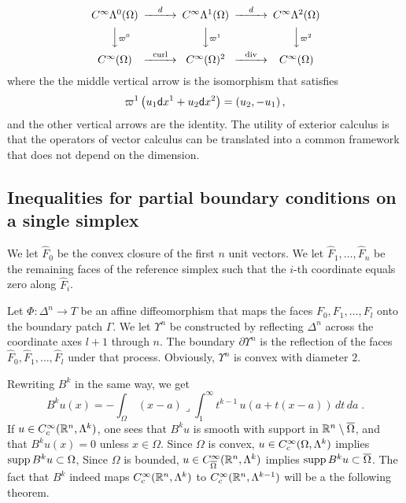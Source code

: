\documentclass[a4paper]{article}
\begin{document}
\begin{remark}
\[\begin{CD}
        C^\infty\Alt^0(\Omega) @>{d}>> C^\infty\Alt^1(\Omega) @>{d}>> C^\infty\Alt^2(\Omega)
        \\
        @VV{\varpi^{0}}V 
        @VV{\varpi^{1}}V 
        @VV{\varpi^{2}}V 
        \\
        C^\infty(\Omega) @>{\curl}>> C^\infty(\Omega)^{2} @>{\divergence}>> C^\infty(\Omega)
    \end{CD}
    \]
    where the the middle vertical arrow is the isomorphism that satisfies 
    \begin{align*}
        \varpi^{1}\left( u_1 {\mathsf d}x^{1} + u_2 {\mathsf d}x^{2} \right)
        =
        \left( u_2, -u_1 \right),
    \end{align*}
    and the other vertical arrows are the identity. 
    The utility of exterior calculus is that the operators of vector calculus can be translated into a common framework that does not depend on the dimension.
\end{remark}






\subsection{Inequalities for partial boundary conditions on a single simplex}


We let $\hat F_0$ be the convex closure of the first $n$ unit vectors. 
We let $\hat F_1, \dots, \hat F_n$ be the remaining faces of the reference simplex 
such that the $i$-th coordinate equals zero along $\hat F_i$.

Let $\Phi : \Delta^{n} \rightarrow T$ be an affine diffeomorphism 
that maps the faces $F_{0}, F_{1}, \dots, F_{l}$ onto the boundary patch $\Gamma$. 
We let $\Upsilon^{n}$ be constructed by reflecting $\Delta^{n}$ across the coordinate axes $l+1$ through $n$.
The boundary $\partial\Upsilon^{n}$ is the reflection of the faces $\hat F_{0}, \hat F_{1}, \dots, \hat F_{l}$ under that process. 
Obviously, $\Upsilon^{n}$ is convex with diameter $2$. 




Rewriting $B^{k}$ in the same way, we get
\begin{equation}\label{eq:Bogo}
    B^{k} u(x) = - \int_{\Omega} \,(x-a) \lrcorner \int_1^\infty t^{{k}-1}\,u\left( a+t(x-a) \right) \,dt\,da\;.
\end{equation}
If $u \in C^{\infty}_{c}({\mathbb R}^{n},\Lambda^{k})$, 
one sees that $B^{k} u$ is smooth with support in ${\mathbb R}^{n}\setminus\overline\Omega$, 
and that $B^{k} u(x) = 0$ unless $x \in \Omega$. 
Since $\Omega$ is convex, $u \in C^{\infty}_{c}(\Omega,\Lambda^{k})$ implies $\operatorname{supp} B^{k} u \subset\Omega$, 
Since $\Omega$ is bounded, $u \in C^{\infty}_{\overline\Omega}({\mathbb R}^{n},\Lambda^{k})$ implies $\operatorname{supp} B^{k} u \subset\overline\Omega$. 
The fact that $B^{k}$ indeed maps 
$C^{\infty}_{c}({\mathbb R}^{n},\Lambda^{k})$ to $C^{\infty}_{c}({\mathbb R}^{n},\Lambda^{{k}-1})$ will be a the following theorem.
\end{document}
